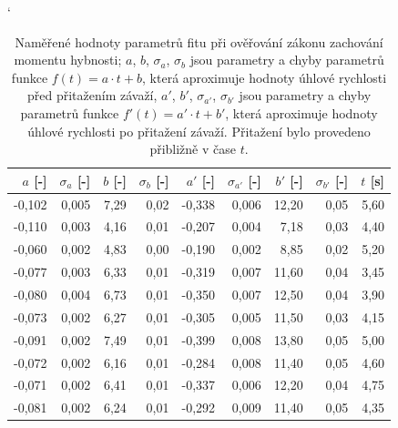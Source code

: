 \documentclass[english]{article}
\begin{document}
\begin{table}[h!]
\catcode` %
\parbox{.65\linewidth}{
\centering
    \begin{tabular}{|r|r|r|r|r|r|r|r|r|}
        \hline
        $a$ [-] & $\sigma_a$ [-] & $b$ [-] & $\sigma_b$ [-] & $a'$ [-] & $\sigma_{a'}$ [-] & $b'$ [-] & $\sigma_{b'}$ [-] & $t$ [s] \bigstrut\\
        \hline
        -0,102 & 0,005 & 7,29  & 0,02  & -0,338 & 0,006 & 12,20 & 0,05  & 5,60 \bigstrut\\
        \hline
        -0,110 & 0,003 & 4,16  & 0,01  & -0,207 & 0,004 & 7,18  & 0,03  & 4,40 \bigstrut\\
        \hline
        -0,060 & 0,002 & 4,83  & 0,00  & -0,190 & 0,002 & 8,85  & 0,02  & 5,20 \bigstrut\\
        \hline
        -0,077 & 0,003 & 6,33  & 0,01  & -0,319 & 0,007 & 11,60 & 0,04  & 3,45 \bigstrut\\
        \hline
        -0,080 & 0,004 & 6,73  & 0,01  & -0,350 & 0,007 & 12,50 & 0,04  & 3,90 \bigstrut\\
        \hline
        -0,073 & 0,002 & 6,27  & 0,01  & -0,305 & 0,005 & 11,50 & 0,03  & 4,15 \bigstrut\\
        \hline
        -0,091 & 0,002 & 7,49  & 0,01  & -0,399 & 0,008 & 13,80 & 0,05  & 5,00 \bigstrut\\
        \hline
        -0,072 & 0,002 & 6,16  & 0,01  & -0,284 & 0,008 & 11,40 & 0,05  & 4,60 \bigstrut\\
        \hline
        -0,071 & 0,002 & 6,41  & 0,01  & -0,337 & 0,006 & 12,20 & 0,04  & 4,75 \bigstrut\\
        \hline
        -0,081 & 0,002 & 6,24  & 0,01  & -0,292 & 0,009 & 11,40 & 0,05  & 4,35 \bigstrut\\
        \hline
        \end{tabular}%
      \caption{Naměřené hodnoty parametrů fitu při ověřování zákonu zachování momentu hybnosti; $a$, $b$, $\sigma_a$, $\sigma_b$ jsou parametry a chyby parametrů funkce $f(t) = a\cdot t + b$, která aproximuje hodnoty úhlové rychlosti před přitažením závaží, $a'$, $b'$, $\sigma_{a'}$, $\sigma_{b'}$ jsou parametry a chyby parametrů funkce $f'(t) = a'\cdot t + b'$, která aproximuje hodnoty úhlové rychlosti po přitažení závaží. Přitažení bylo provedeno přibližně v čase $t$.}
            \label{tab:zzmh}%

}
\end{table}
\end{document}
